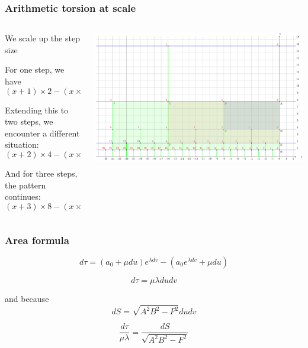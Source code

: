 \documentclass[aspectratio=169]{beamer}
\begin{document}
\begin{frame}
    \frametitle{Arithmetic torsion at scale}
    \begin{columns}
        \begin{column}{0.5\textwidth}
            We scale up the step size

            For one step, we have
            \begin{equation}
            (x + 1) \times 2 - (x \times 2 + 1) = 1
            \end{equation}

            Extending this to two steps, we encounter a different situation:
            \begin{equation}
            (x + 2) \times 4 - (x \times 4 + 2) = 6
            \end{equation}

            And for three steps, the pattern continues:
            \begin{equation}
            (x + 3) \times 8 - (x \times 8 + 3) = 21
            \end{equation}
        \end{column}
        \begin{column}{0.5\textwidth}
            \begin{center}
                \includegraphics[width=1.0\textwidth]{../images/17-area-formula}
            \end{center}
        \end{column}
    \end{columns}
\end{frame}

\begin{frame}
    \frametitle{Area formula}
    \[
        d\tau = (a_0 + \mu du) e^{\lambda dv} - (a_0 e^{\lambda dv} + \mu du)
    \]

    \[
        d\tau = \mu \lambda du dv
    \]

    and because
    \[
        dS = \sqrt{A^2B^2 - F^2} du dv
    \]

    \begin{equation}
        \frac{d\tau}{\mu \lambda} = \frac{dS}{\sqrt{A^2B^2 - F^2}}
    \end{equation}
\end{frame}
\end{document}
